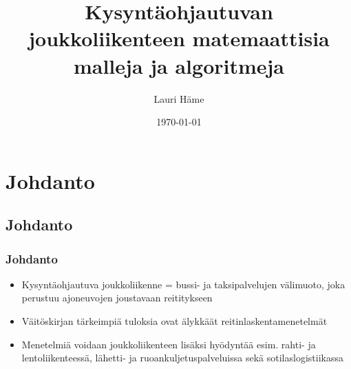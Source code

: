 \documentclass{beamer}
\title[Aalto-yliopiston perustieteiden korkeakoulu]{Kysyntäohjautuvan joukkoliikenteen matemaattisia malleja ja algoritmeja}
\author[L. Häme]{Lauri Häme}                 %
\institute[Aalto-yliopiston perustieteiden korkeakoulu]{Aalto-yliopiston perustieteiden korkeakoulu}      %
\date{\today}      %
\begin{document}
\begin{frame}
  \titlepage
\end{frame}

\section{Johdanto}

\subsection{Johdanto}
\begin{frame}
  \frametitle{Johdanto}   %
  \begin{itemize}
    \item 
Kysyntäohjautuva joukkoliikenne = bussi- ja taksipalvelujen välimuoto, joka perustuu ajoneuvojen joustavaan reititykseen
\item
Väitöskirjan tärkeimpiä tuloksia ovat älykkäät reitinlaskentamenetelmät
\item
Menetelmiä voidaan joukkoliikenteen lisäksi hyödyntää esim.
rahti- ja lentoliikenteessä, lähetti- ja ruoankuljetuspalveluissa sekä sotilaslogistiikassa
  \end{itemize}
\end{frame}
\end{document}
